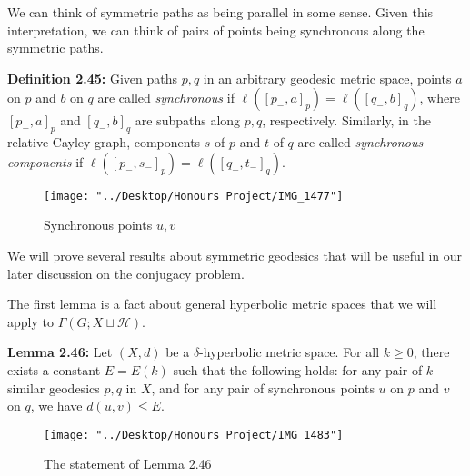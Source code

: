 \documentclass[12pt]{article}
\newcommand{\vs}{\vskip10pt}
\begin{document}
	\vs 
	
	We can think of symmetric paths as being parallel in some sense. Given this interpretation, we can think of pairs of points being synchronous along the symmetric paths. 
	
	\vs 
	
	\textbf{Definition 2.45: } Given paths $p,q$ in an arbitrary geodesic metric space, points $a$ on $p$ and $b$ on $q$ are called \textit{synchronous} if $\ell([p_{-}, a]_p) = \ell([q_{-}, b]_q)$, where $[p_{-}, a]_p$ and $[q_{-}, b]_q$ are subpaths along $p,q$, respectively. Similarly, in the relative Cayley graph, components $s$ of $p$ and $t$ of $q$ are called \textit{synchronous components} if $\ell([p_{-}, s_{-}]_p) = \ell([q_{-}, t_{-}]_q)$. 
	
\begin{figure} [H]
	\centering
	\texttt{[image: "../Desktop/Honours Project/IMG\_1477"]}
	\caption{Synchronous points $u,v$}
	\label{fig:img1477}
\end{figure}
	
	\vs 
	
	We will prove several results about symmetric geodesics that will be useful in our later discussion on the conjugacy problem. 
	
	\vs 
	
	The first lemma is a fact about general hyperbolic metric spaces that we will apply to $\Gamma(G; X \sqcup \mathcal{H})$. 
	
	\vs 
	
	\textbf{Lemma 2.46: } Let $(X,d)$ be a $\delta$-hyperbolic metric space. For all $k \geq 0$, there exists a constant $E = E(k)$ such that the following holds: for any pair of $k$-similar geodesics $p,q$ in $X$, and for any pair of synchronous points $u$ on $p$ and $v$ on $q$, we have $d(u,v) \leq E$. 
	
\begin{figure} [H]
	\centering
	\texttt{[image: "../Desktop/Honours Project/IMG\_1483"]}
	\caption{The statement of Lemma 2.46}
	\label{fig:img1483}
\end{figure}
	
\end{document}
